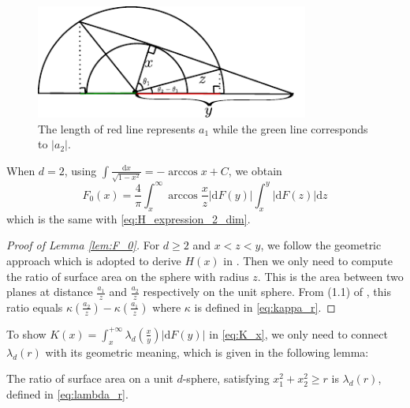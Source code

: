 \documentclass{aptpub}
\def\d{\mathrm{d}}
\begin{document}
\begin{figure}[!ht]
     \centering
     \includegraphics[width=0.8\textwidth]{dessin.pdf}
     \caption{The length of red line represents $a_1$ while the green line corresponds to $|a_2|$.}
     \label{fig:a1a2}
\end{figure}
When $d=2$, using $\int \frac{\d x}{\sqrt{1-x^2}} = -\arccos x + C$,
we obtain
$$
F_0(x)=\frac{4}{\pi} \int_x^{\infty} \arccos\frac{x}{z}|\d F(y)|
\int_x^{y} |\d F(z)|\d z
$$
which is the same with \eqref{eq:H_expression_2_dim}.
\begin{proof}[Proof of Lemma \ref{lem:F_0}]
For $d\geq 2$ and $x<z<y$, we follow the geometric approach
which is adopted to derive
$H(x)$ in \cite{carnal1970konvexe}.
Then we only need to compute the ratio of surface area
on the sphere with radius $z$. This is the area between
two planes at distance $\frac{a_1}{z}$ and $\frac{a_2}{z}$
respectively on the unit sphere. From (1.1) of \cite{dwyer1991convex},
this ratio equals $\kappa(\frac{a_2}{z}) - \kappa(\frac{a_1}{z})$
where $\kappa$ is defined in \eqref{eq:kappa_r}.

\end{proof}
To show 
$K(x) = \int_x^{+\infty} \lambda_d(\frac{x}{y})|\d F(y)|$
in \eqref{eq:K_x},
we only need to connect $\lambda_d(r)$ with its geometric meaning,
which is given in the following lemma:
\begin{lemma}
     The ratio of surface area on a unit $d$-sphere,
     satisfying $x_1^2+x_2^2\geq r$ is $\lambda_d(r)$,
     defined in \eqref{eq:lambda_r}.
\end{lemma}
\end{document}
